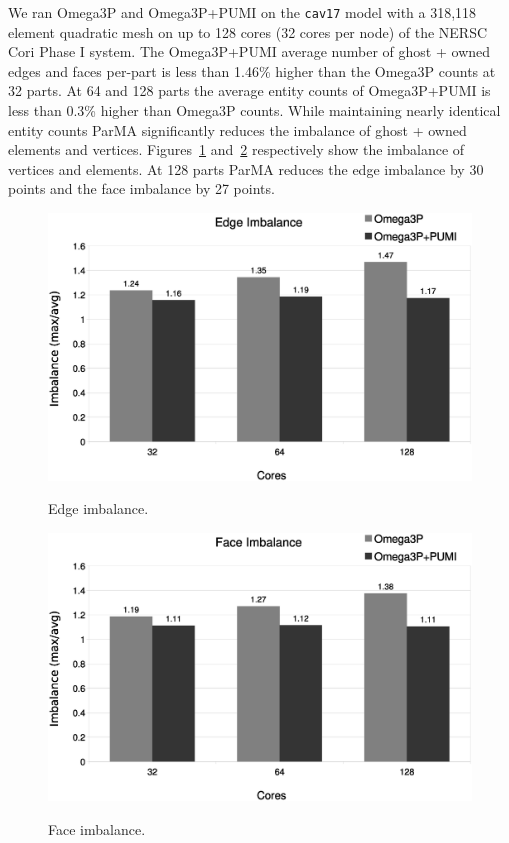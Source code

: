 \documentclass[a4paper]{article}
\begin{document}
We ran Omega3P and Omega3P+PUMI on the \texttt{cav17} model with a 318,118
element quadratic mesh on up to 128 cores (32 cores per node) of the NERSC Cori
Phase I system.
The Omega3P+PUMI average number of ghost + owned edges and faces per-part
is less than 1.46\% higher than the Omega3P counts at 32 parts.
At 64 and 128 parts the average entity counts of Omega3P+PUMI is less than 0.3\%
higher than Omega3P counts.
While maintaining nearly identical entity counts ParMA significantly reduces the
imbalance of ghost + owned elements and vertices. 
Figures~\ref{fig:vtx} and~\ref{fig:elm} respectively show the imbalance of
vertices and elements.
At 128 parts ParMA reduces the edge imbalance by 30 points and the face
imbalance by 27 points.

\begin{figure}[ht]
\centering
  \includegraphics[width=\textwidth]{edge-imb.eps} \\
  \caption{\label{fig:vtx} Edge imbalance.}
\end{figure}

\begin{figure}[ht]
\centering
  \includegraphics[width=\textwidth]{face-imb.eps} \\
  \caption{\label{fig:elm} Face imbalance.}
\end{figure}
\end{document}
